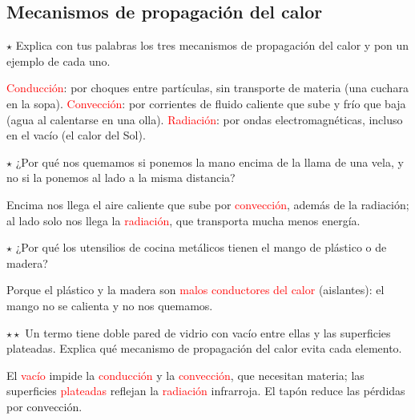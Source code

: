 \subsection{Mecanismos de propagación del calor}

\begin{exercise}
    \(\star\) Explica con tus palabras los tres mecanismos de propagación del calor y pon un ejemplo de cada uno.
    \begin{solu}
        \textcolor{red}{Conducción}: por choques entre partículas, sin transporte de materia (una cuchara en la sopa).
        \textcolor{red}{Convección}: por corrientes de fluido caliente que sube y frío que baja (agua al calentarse en una olla).
        \textcolor{red}{Radiación}: por ondas electromagnéticas, incluso en el vacío (el calor del Sol).
    \end{solu}
\end{exercise}

\begin{exercise}
    \(\star\) ¿Por qué nos quemamos si ponemos la mano encima de la llama de una vela, y no si la ponemos al lado a la misma
    distancia?
    \begin{solu}
        Encima nos llega el aire caliente que sube por \textcolor{red}{convección}, además de la radiación; al lado solo nos llega la
        \textcolor{red}{radiación}, que transporta mucha menos energía.
    \end{solu}
\end{exercise}

\begin{exercise}
    \(\star\) ¿Por qué los utensilios de cocina metálicos tienen el mango de plástico o de madera?
    \begin{solu}
        Porque el plástico y la madera son \textcolor{red}{malos conductores del calor} (aislantes): el mango no se calienta y no nos
        quemamos.
    \end{solu}
\end{exercise}

\begin{exercise}
    \(\star\star\) Un termo tiene doble pared de vidrio con vacío entre ellas y las superficies plateadas. Explica qué mecanismo de
    propagación del calor evita cada elemento.
    \begin{solu}
        El \textcolor{red}{vacío} impide la \textcolor{red}{conducción} y la \textcolor{red}{convección}, que necesitan materia; las
        superficies \textcolor{red}{plateadas} reflejan la \textcolor{red}{radiación} infrarroja. El tapón reduce las pérdidas por
        convección.
    \end{solu}
\end{exercise}

